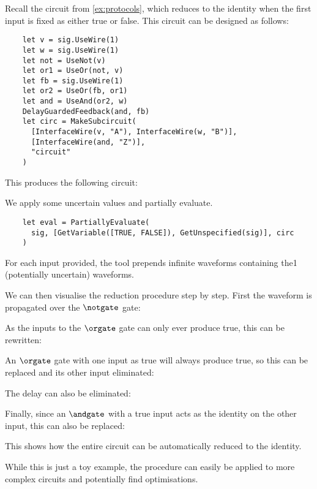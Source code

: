 \begin{example}
  Recall the circuit from \cref{ex:protocols}, which reduces to the identity
  when the first input is fixed as either true or false.
  This circuit can be designed as follows:
  \begin{lstlisting}
    let v = sig.UseWire(1)
    let w = sig.UseWire(1)
    let not = UseNot(v)
    let or1 = UseOr(not, v)
    let fb = sig.UseWire(1)
    let or2 = UseOr(fb, or1)
    let and = UseAnd(or2, w)
    DelayGuardedFeedback(and, fb)
    let circ = MakeSubcircuit(
      [InterfaceWire(v, "A"), InterfaceWire(w, "B")],
      [InterfaceWire(and, "Z")],
      "circuit"
    )
  \end{lstlisting}
  This produces the following circuit:
  \begin{center}
    
  \end{center}
  We apply some uncertain values and partially evaluate.
  \begin{lstlisting}
    let eval = PartiallyEvaluate(
      sig, [GetVariable([TRUE, FALSE]), GetUnspecified(sig)], circ
    )
  \end{lstlisting}
  For each input provided, the tool prepends infinite waveforms containing the1
  (potentially uncertain) waveforms.
  \begin{center}
    
  \end{center}
  We can then visualise the reduction procedure step by step. First the
  waveform is propagated over the \(\notgate\) gate:
  \begin{center}
    
  \end{center}
  As the inputs to the \(\orgate\) gate can only ever produce true, this can be
  rewritten:
  \begin{center}
    
  \end{center}
  An \(\orgate\) gate with one input as true will always produce true, so this
  can be replaced and its other input eliminated:
  \begin{center}
    
  \end{center}
  The delay can also be eliminated:
  \begin{center}
    
  \end{center}
  Finally, since an \(\andgate\) with a true input acts as the identity on the
  other input, this can also be replaced:
  \begin{center}
    
  \end{center}
  This shows how the entire circuit can be automatically reduced to the
  identity.
\end{example}

While this is just a toy example, the procedure can easily be applied to more
complex circuits and potentially find optimisations.